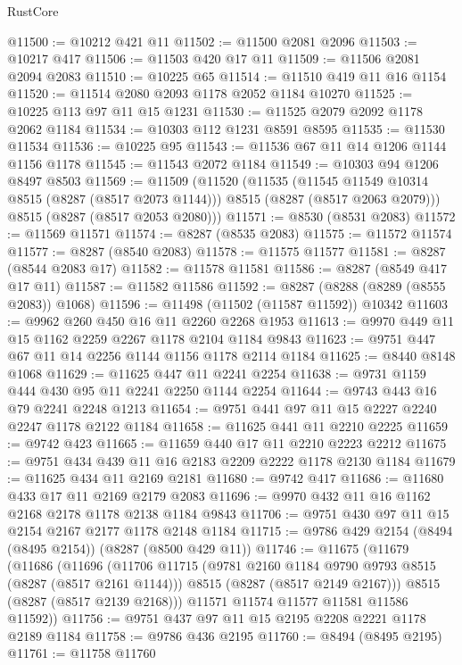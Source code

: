 \begin{lexlean}{RustCore}
\begin{coremodule}
@11500 := @10212 @421 @11
@11502 := @11500 @2081 @2096
@11503 := @10217 @417
@11506 := @11503 @420 @17 @11
@11509 := @11506 @2081 @2094 @2083
@11510 := @10225 @65
@11514 := @11510 @419 @11 @16 @1154
@11520 := @11514 @2080 @2093 @1178 @2052 @1184 @10270
@11525 := @10225 @113 @97 @11 @15 @1231
@11530 := @11525 @2079 @2092 @1178 @2062 @1184
@11534 := @10303 @112 @1231 @8591 @8595
@11535 := @11530 @11534
@11536 := @10225 @95
@11543 := @11536 @67 @11 @14 @1206 @1144 @1156 @1178
@11545 := @11543 @2072 @1184
@11549 := @10303 @94 @1206 @8497 @8503
@11569 := @11509
    (@11520
      (@11535
        (@11545 @11549 @10314 @8515 (@8287 (@8517 @2073 @1144)))
        @8515
        (@8287 (@8517 @2063 @2079)))
      @8515
      (@8287 (@8517 @2053 @2080)))
@11571 := @8530 (@8531 @2083)
@11572 := @11569 @11571
@11574 := @8287 (@8535 @2083)
@11575 := @11572 @11574
@11577 := @8287 (@8540 @2083)
@11578 := @11575 @11577
@11581 := @8287 (@8544 @2083 @17)
@11582 := @11578 @11581
@11586 := @8287 (@8549 @417 @17 @11)
@11587 := @11582 @11586
@11592 := @8287 (@8288 (@8289 (@8555 @2083)) @1068)
@11596 := @11498 (@11502 (@11587 @11592)) @10342
@11603 := @9962 @260 @450 @16 @11 @2260 @2268 @1953
@11613 := @9970 @449 @11 @15 @1162 @2259 @2267 @1178 @2104 @1184 @9843
@11623 := @9751 @447 @67 @11 @14 @2256 @1144 @1156 @1178 @2114 @1184
@11625 := @8440 @8148 @1068
@11629 := @11625 @447 @11 @2241 @2254
@11638 := @9731 @1159 @444 @430 @95 @11 @2241 @2250 @1144 @2254
@11644 := @9743 @443 @16 @79 @2241 @2248 @1213
@11654 := @9751 @441 @97 @11 @15 @2227 @2240 @2247 @1178 @2122 @1184
@11658 := @11625 @441 @11 @2210 @2225
@11659 := @9742 @423
@11665 := @11659 @440 @17 @11 @2210 @2223 @2212
@11675 := @9751 @434 @439 @11 @16 @2183 @2209 @2222 @1178 @2130 @1184
@11679 := @11625 @434 @11 @2169 @2181
@11680 := @9742 @417
@11686 := @11680 @433 @17 @11 @2169 @2179 @2083
@11696 := @9970 @432 @11 @16 @1162 @2168 @2178 @1178 @2138 @1184 @9843
@11706 := @9751 @430 @97 @11 @15 @2154 @2167 @2177 @1178 @2148 @1184
@11715 := @9786 @429 @2154 (@8494 (@8495 @2154)) (@8287 (@8500 @429 @11))
@11746 := @11675
    (@11679
      (@11686
        (@11696
          (@11706
            @11715
            (@9781 @2160 @1184 @9790 @9793 @8515 (@8287 (@8517 @2161 @1144)))
            @8515
            (@8287 (@8517 @2149 @2167)))
          @8515
          (@8287 (@8517 @2139 @2168)))
        @11571
        @11574
        @11577
        @11581
        @11586
        @11592))
@11756 := @9751 @437 @97 @11 @15 @2195 @2208 @2221 @1178 @2189 @1184
@11758 := @9786 @436 @2195
@11760 := @8494 (@8495 @2195)
@11761 := @11758 @11760

\end{coremodule}
\end{lexlean}

